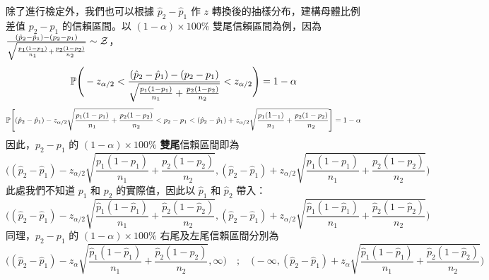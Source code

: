     除了進行檢定外，我們也可以根據 $\hat{p}_2 - \hat{p}_1$ 作 $z$ 轉換後的抽樣分布，建構母體比例差值 $p_2 - p_1$ 的信賴區間。以 $(1-\alpha) \times 100\%$ 雙尾信賴區間為例，因為 $\frac{(\hat{p}_2-\hat{p}_1)-(p_2-p_1)}{\sqrt{\frac{p_1(1-p_1)}{n_1} + \frac{p_2(1-p_2)}{n_2}}} \sim \mathcal{Z}$，
    \[\mathbb{P}\Bigg(-z_{\alpha/2} < \frac{(\hat{p}_2-\hat{p}_1)-(p_2-p_1)}{\sqrt{\frac{p_1(1-p_1)}{n_1} + \frac{p_2(1-p_2)}{n_2}}} < z_{\alpha/2}\Bigg) = 1-\alpha\]
    \[\mathbb{P}\Bigg[(\hat{p}_2-\hat{p}_1) - z_{\alpha/2} \sqrt{\frac{p_1(1-p_1)}{n_1} + \frac{p_2(1-p_2)}{n_2}} < p_2-p_1  < (\hat{p}_2-\hat{p}_1) + z_{\alpha/2} \sqrt{\frac{p_1(1-_1)}{n_1} + \frac{p_2(1-p_2)}{n_2}}\Bigg] = 1-\alpha\]
    因此，$p_2-p_1$ 的 $(1-\alpha) \times 100\%$ \textbf{雙尾}信賴區間即為
    \[\Bigg((\hat{p}_2-\hat{p}_1) - z_{\alpha/2} \sqrt{\frac{p_1(1-p_1)}{n_1} + \frac{p_2(1-p_2)}{n_2}}, (\hat{p}_2-\hat{p}_1) + z_{\alpha/2} \sqrt{\frac{p_1(1-p_1)}{n_1} + \frac{p_2(1-p_2)}{n_2}}\Bigg)\]
    此處我們不知道 $p_1$ 和 $p_2$ 的實際值，因此以 $\hat{p}_1$ 和 $\hat{p}_2$ 帶入：
    \[\Bigg((\hat{p}_2-\hat{p}_1) - z_{\alpha/2} \sqrt{\frac{\hat{p}_1(1-\hat{p}_1)}{n_1} + \frac{\hat{p}_2(1-\hat{p}_2)}{n_2}}, (\hat{p}_2-\hat{p}_1) + z_{\alpha/2} \sqrt{\frac{\hat{p}_1(1-\hat{p}_1)}{n_1} + \frac{\hat{p}_2(1-\hat{p}_2)}{n_2}}\Bigg)\]
    同理，$p_2-p_1$ 的 $(1-\alpha) \times 100\%$ 右尾及左尾信賴區間分別為
    \[\Bigg((\hat{p}_2-\hat{p}_1) - z_{\alpha} \sqrt{\frac{\hat{p}_1(1-\hat{p}_1)}{n_1} + \frac{\hat{p}_2(1-\hat{p}_2)}{n_2}}, \infty \Bigg) \quad ; \quad \Bigg(-\infty, (\hat{p}_2-\hat{p}_1) + z_{\alpha} \sqrt{\frac{\hat{p}_1(1-\hat{p}_1)}{n_1} + \frac{\hat{p}_2(1-\hat{p}_2)}{n_2}} \Bigg)\]



    
    
